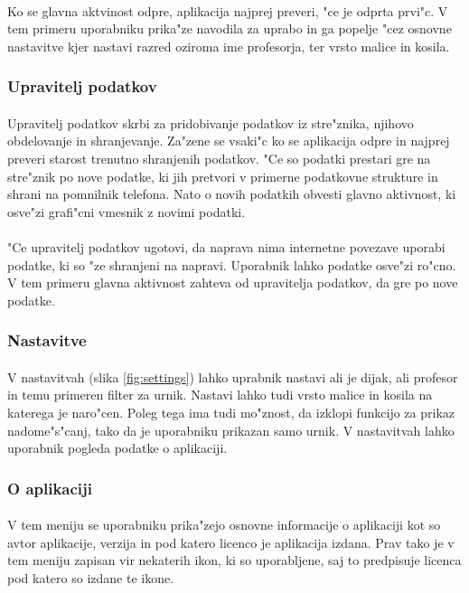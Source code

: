 \paragraph{}Ko se glavna aktvinost odpre, aplikacija najprej preveri, "ce je odprta prvi"c. V tem primeru uporabniku prika"ze navodila za uprabo in ga popelje "cez osnovne nastavitve kjer nastavi razred oziroma ime profesorja, ter vrsto malice in kosila.

\subsubsection{Upravitelj podatkov}
\paragraph{}Upravitelj podatkov skrbi za pridobivanje podatkov iz stre"znika, njihovo obdelovanje in shranjevanje. Za"zene se vsaki"c ko se aplikacija odpre in najprej preveri starost trenutno shranjenih podatkov. "Ce so podatki prestari gre na stre"znik po nove podatke, ki jih pretvori v primerne podatkovne strukture in shrani na pomnilnik telefona. Nato o novih podatkih obvesti glavno aktivnost, ki osve"zi grafi"cni vmesnik z novimi podatki.

\paragraph{}"Ce upravitelj podatkov ugotovi, da naprava nima internetne povezave uporabi podatke, ki so "ze shranjeni na napravi. Uporabnik lahko podatke osve"zi ro"cno. V tem primeru glavna aktivnost zahteva od upravitelja podatkov, da gre po nove podatke.

\subsubsection{Nastavitve}
\paragraph{}V nastavitvah (slika \ref{fig:settings}) lahko uprabnik nastavi ali je dijak, ali profesor in temu primeren filter za urnik. Nastavi lahko tudi vrsto malice in kosila na katerega je naro"cen. Poleg tega ima tudi mo"znost, da izklopi funkcijo za prikaz nadome"s"canj, tako da je uporabniku prikazan samo urnik. V nastavitvah lahko uporabnik pogleda podatke o aplikaciji.

\subsubsection{O aplikaciji}
\paragraph{}V tem meniju se uporabniku prika"zejo osnovne informacije o aplikaciji kot so avtor aplikacije, verzija in pod katero licenco je aplikacija izdana. Prav tako je v tem meniju zapisan vir nekaterih ikon, ki so uporabljene, saj to predpisuje licenca pod katero so izdane te ikone.
